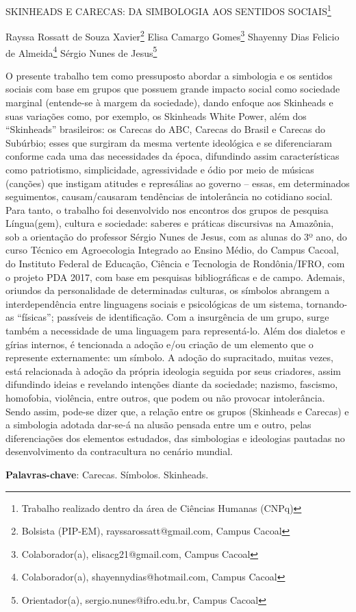 \documentclass[article,12pt,onesidea,4paper,english,brazil]{abntex2}
\begin{document}
	
	
	\frenchspacing 
	
	\begin{center}
		\LARGE SKINHEADS E CARECAS: DA SIMBOLOGIA AOS SENTIDOS SOCIAIS\footnote{Trabalho realizado dentro da área de Ciências Humanas (CNPq)}
		
		\normalsize
		Rayssa Rossatt de Souza Xavier\footnote{Bolsista (PIP-EM), rayssarossatt@gmail.com, Campus Cacoal} 
	Elisa Camargo Gomes\footnote{Colaborador(a), elisacg21@gmail.com, Campus Cacoal} 
		Shayenny Dias Felicio de Almeida\footnote{Colaborador(a), shayennydias@hotmail.com, Campus Cacoal} 
	Sérgio Nunes de Jesus\footnote{Orientador(a), sergio.nunes@ifro.edu.br, Campus Cacoal} 
	\end{center}
	
	\noindent O presente trabalho tem como pressuposto abordar a simbologia e os sentidos sociais com base em grupos que possuem grande impacto social como sociedade marginal (entende-se à margem da sociedade), dando enfoque aos Skinheads e suas variações como, por exemplo, os Skinheads White Power, além dos “Skinheads” brasileiros: os Carecas do ABC, Carecas do Brasil e Carecas do Subúrbio; esses que surgiram da mesma vertente ideológica e se diferenciaram conforme cada uma das necessidades da época, difundindo assim características como patriotismo, simplicidade, agressividade e ódio por meio de músicas (canções) que instigam atitudes e represálias ao governo – essas, em determinados seguimentos, causam/causaram tendências de intolerância no cotidiano social. Para tanto, o trabalho foi desenvolvido nos encontros dos grupos de pesquisa Língua(gem), cultura e sociedade: saberes e práticas discursivas na Amazônia, sob a orientação do professor Sérgio Nunes de Jesus, com as alunas do 3º ano, do curso Técnico em Agroecologia Integrado ao Ensino Médio, do Campus Cacoal, do Instituto Federal de Educação, Ciência e Tecnologia de Rondônia/IFRO, com o projeto PDA 2017, com base em pesquisas bibliográficas e de campo. Ademais, oriundos da personalidade de determinadas culturas, os símbolos abrangem a interdependência entre linguagens sociais e psicológicas de um sistema, tornando-as “físicas”; passíveis de identificação. Com a insurgência de um grupo, surge também a necessidade de uma linguagem para representá-lo. Além dos dialetos e gírias internos, é tencionada a adoção e/ou criação de um elemento que o represente externamente: um símbolo. A adoção do supracitado, muitas vezes, está relacionada à adoção da própria ideologia seguida por seus criadores, assim difundindo ideias e revelando intenções diante da sociedade; nazismo, fascismo, homofobia, violência, entre outros, que podem ou não provocar intolerância. Sendo assim, pode-se dizer que, a relação entre os grupos (Skinheads e Carecas) e a simbologia adotada dar-se-á na alusão pensada entre um e outro, pelas diferenciações dos elementos estudados, das simbologias e ideologias pautadas no desenvolvimento da contracultura no cenário mundial.
	
	\vspace{\onelineskip}
	
	\noindent
	\textbf{Palavras-chave}: Carecas. Símbolos. Skinheads.
	
\end{document}
